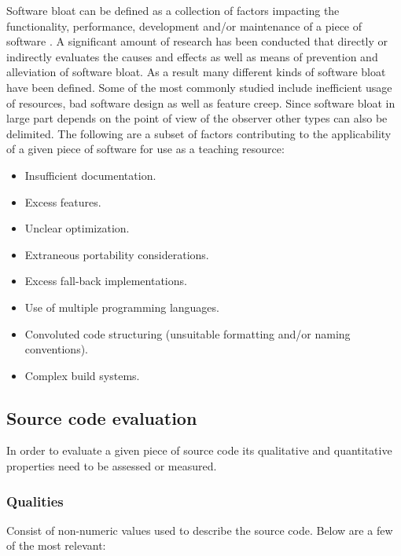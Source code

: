 Software bloat can be defined as a collection of factors impacting the functionality, performance, development and/or maintenance of a piece of software \cite{McGrenere2000AreWA,McGrenere2000BloatTO,Quach2018DebloatingST,Quach2019BloatFA}. A significant amount of research has been conducted that directly or indirectly evaluates the causes \cite{Mitchell2010FourTL} and effects \cite{Quach2019BloatFA} as well as means of prevention \cite{Pike2007ProgramDI,Milicchio2007TheUK} and alleviation \cite{Quach2018DebloatingST} of software bloat. As a result many different kinds of software bloat have been defined. Some of the most commonly studied include inefficient usage of resources, bad software design as well as feature creep. Since software bloat in large part depends on the point of view of the observer other types can also be delimited. The following are a subset of factors contributing to the applicability of a given piece of software for use as a teaching resource:

\begin{itemize}
    \item Insufficient documentation.
    \item Excess features.
    \item Unclear optimization.
    \item Extraneous portability considerations.
    \item Excess fall-back implementations.
    \item Use of multiple programming languages.
    \item Convoluted code structuring (unsuitable formatting and/or naming conventions).
    \item Complex build systems.
\end{itemize}

\subsection{Source code evaluation}

In order to evaluate a given piece of source code its qualitative and quantitative properties need to be assessed or measured. 

\subsubsection{Qualities}

Consist of non-numeric values used to describe the source code. Below are a few of the most relevant:

